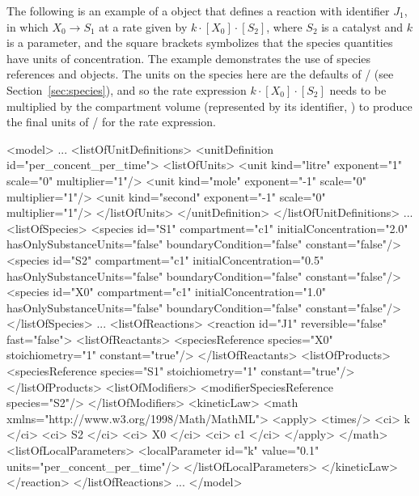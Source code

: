 The following is an example of a \Reaction object that defines
a reaction with identifier $J_1$, in which $X_0 \rightarrow S_1$
at a rate given by $k \cdot [X_0] \cdot [S_2]$, where $S_2$ is a catalyst
and $k$ is a parameter, and the square brackets symbolizes that
the species quantities have units of concentration.  The example
demonstrates the use of species references and \KineticLaw
objects.  The units on the species here are the defaults of
/ (see
Section~\ref{sec:species}), and so the rate expression $k \cdot [X_0]
 \cdot [S_2]$ needs to be multiplied by the compartment volume
(represented by its identifier, ) to produce the final
units of / for the rate
expression.

\begin{example}
<model>
    ...
    <listOfUnitDefinitions>
        <unitDefinition id="per_concent_per_time">
            <listOfUnits>
                <unit kind="litre" exponent="1" scale="0" multiplier="1"/>
                <unit kind="mole"   exponent="-1" scale="0" multiplier="1"/>
                <unit kind="second" exponent="-1" scale="0" multiplier="1"/>
            </listOfUnits>
        </unitDefinition>
    </listOfUnitDefinitions>
    ...
    <listOfSpecies>
        <species id="S1" compartment="c1" initialConcentration="2.0" 
              hasOnlySubstanceUnits="false" boundaryCondition="false" constant="false"/>
        <species id="S2" compartment="c1" initialConcentration="0.5" 
              hasOnlySubstanceUnits="false" boundaryCondition="false" constant="false"/>
        <species id="X0" compartment="c1" initialConcentration="1.0" 
              hasOnlySubstanceUnits="false" boundaryCondition="false" constant="false"/>
    </listOfSpecies>
    ...
    <listOfReactions>
        <reaction id="J1" reversible="false" fast="false">
            <listOfReactants>
                <speciesReference species="X0" stoichiometry="1" constant="true"/>
            </listOfReactants>
            <listOfProducts>
                <speciesReference species="S1" stoichiometry="1" constant="true"/>
            </listOfProducts>
            <listOfModifiers>
                <modifierSpeciesReference species="S2"/>
            </listOfModifiers>
            <kineticLaw>
                <math xmlns="http://www.w3.org/1998/Math/MathML">
                    <apply>
                        <times/> <ci> k </ci> <ci> S2 </ci> <ci> X0 </ci> <ci> c1 </ci>
                    </apply>
                </math>
                <listOfLocalParameters>
                    <localParameter id="k" value="0.1" units="per_concent_per_time"/>
                </listOfLocalParameters>
            </kineticLaw>
        </reaction>
    </listOfReactions>
    ...
</model>
\end{example}



